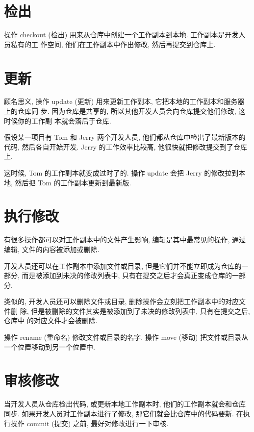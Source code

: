 \documentclass[nofonts, oneside]{ctexbook}
\begin{document}
\section{检出}
\label{sec:checkout}

操作 checkout (检出) 用来从仓库中创建一个工作副本到本地. 工作副本是开发人员私有的工
作空间, 他们在工作副本中作出修改, 然后再提交到仓库上.

\section{更新}
\label{sec:update}

顾名思义, 操作 update (更新) 用来更新工作副本, 它把本地的工作副本和服务器上的仓库同
步. 因为仓库是共享的, 所以其他开发人员会向仓库提交他们修改, 这时候你的工作副
本就会落后于仓库.

假设某一项目有 Tom 和 Jerry 两个开发人员, 他们都从仓库中检出了最新版本的代码,
然后各自开始开发. Jerry 的工作效率比较高, 他很快就把修改提交到了仓库上.

这时候, Tom 的工作副本就变成过时了的. 操作 update 会把 Jerry 的修改拉到本地,
然后把 Tom 的工作副本更新到最新版.

\section{执行修改}
\label{sec:perform_changes}

有很多操作都可以对工作副本中的文件产生影响, 编辑是其中最常见的操作, 通过编辑,
文件的内容被添加或删除.

开发人员还可以在工作副本中添加文件或目录, 但是它们并不能立即成为仓库的一部分,
而是被添加到未决的修改列表中, 只有在提交之后才会真正变成仓库的一部分.

类似的, 开发人员还可以删除文件或目录, 删除操作会立刻把工作副本中的对应文件删
除, 但是被删除的文件其实是被添加到了未决的修改列表中, 只有在提交之后, 仓库中
的对应文件才会被删除.

操作 rename (重命名) 修改文件或目录的名字. 操作 move (移动) 把文件或目录从
一个位置移动到另一个位置中.

\section{审核修改}
\label{sec:review_changes}

当开发人员从仓库检出代码, 或更新本地工作副本时, 他们的工作副本就会和仓库同步.
如果开发人员对工作副本进行了修改, 那它们就会比仓库中的代码要新. 在执行操作
commit (提交) 之前, 最好对修改进行一下审核.
\end{document}
